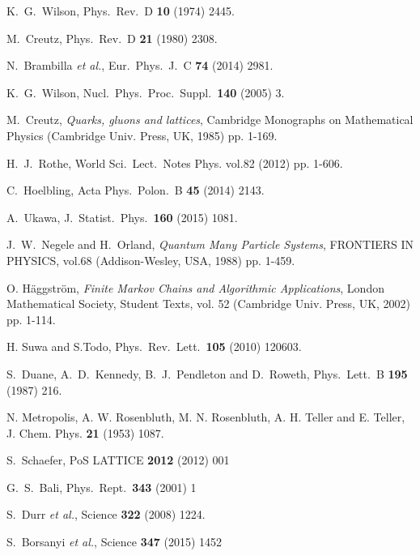 \begin{thebibliography}{99.}%

  K.~G.~Wilson, Phys.\ Rev.\ D {\bf 10} (1974) 2445.
  
  M.~Creutz,
  Phys.\ Rev.\ D {\bf 21} (1980) 2308. 
  
  N.~Brambilla {\it et al.},
  Eur.\ Phys.\ J.\ C {\bf 74} (2014) 2981.
   
  K.~G.~Wilson,
  Nucl.\ Phys.\ Proc.\ Suppl.\  {\bf 140} (2005) 3.
  
  M.~Creutz, {\em Quarks, gluons and lattices}, 
  Cambridge Monographs on Mathematical Physics (Cambridge Univ. Press, UK, 1985) pp. 1-169.
    
  H.~J.~Rothe, World Sci.\ Lect.\ Notes Phys. vol.82 (2012) pp. 1-606.

  C.~Hoelbling, Acta Phys.\ Polon.\ B {\bf 45} (2014)  2143.


  A.~Ukawa, J.\ Statist.\ Phys.\  {\bf 160} (2015) 1081.
 
  J.~W.~Negele and H.~Orland,
 {\em Quantum Many Particle Systems}, 
  FRONTIERS IN PHYSICS, vol.68 (Addison-Wesley, USA, 1988) pp. 1-459.    

  O. H\"{a}ggstr\"{o}m,
  {\em Finite Markov Chains and Algorithmic Applications}, 
 London Mathematical Society, Student Texts, vol. 52   (Cambridge Univ. Press, UK, 2002) pp. 1-114.    

 H. Suwa and S.Todo,
 Phys.\ Rev.\ Lett.\ {\bf 105} (2010) 120603.

  S.~Duane, A.~D.~Kennedy, B.~J.~Pendleton and D.~Roweth,
  Phys.\ Lett.\ B {\bf 195} (1987) 216.

  
 N. Metropolis, A. W. Rosenbluth, M. N. Rosenbluth, A. H. Teller and E. Teller,
 J. Chem. Phys. {\bf 21} (1953) 1087.
  
  S.~Schaefer,
  PoS LATTICE {\bf 2012} (2012) 001
  
  G.~S.~Bali,
  Phys.\ Rept.\  {\bf 343} (2001) 1

  S.~Durr {\it et al.},
  Science {\bf 322} (2008) 1224.
  
  S.~Borsanyi {\it et al.}, Science {\bf 347} (2015) 1452
  

\end{thebibliography}
